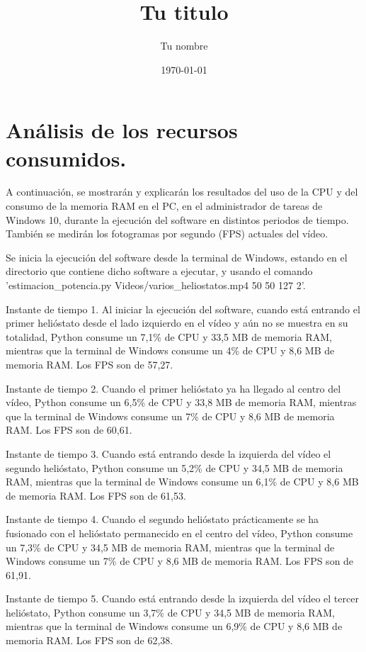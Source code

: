 \documentclass[12pt]{article}
\title{Tu titulo}					%
\author{Tu nombre}					%
\date{\today}						%
\begin{document}
\tableofcontents
\pagebreak


\section{Análisis de los recursos consumidos.}

A continuación, se mostrarán y explicarán los resultados del uso de la CPU y del consumo de la memoria RAM en el PC, en el administrador de tareas de Windows 10, durante la ejecución del software en distintos periodos de tiempo. También se medirán los fotogramas por segundo (FPS) actuales del vídeo.

Se inicia la ejecución del software desde la terminal de Windows, estando en el directorio que contiene dicho software a ejecutar, y usando el comando 'estimacion\_potencia.py Videos/varios\_heliostatos.mp4 50 50 127 2'.



Instante de tiempo 1. Al iniciar la ejecución del software, cuando está entrando el primer helióstato desde el lado izquierdo en el vídeo y aún no se muestra en su totalidad, Python consume un 7,1\% de CPU y 33,5 MB de memoria RAM, mientras que la terminal de Windows consume un 4\% de CPU y 8,6 MB de memoria RAM. Los FPS son de 57,27.




Instante de tiempo 2. Cuando el primer helióstato ya ha llegado al centro del vídeo, Python consume un 6,5\% de CPU y 33,8 MB de memoria RAM, mientras que la terminal de Windows consume un 7\% de CPU y 8,6 MB de memoria RAM. Los FPS son de 60,61.




Instante de tiempo 3. Cuando está entrando desde la izquierda del vídeo el segundo helióstato, Python consume un 5,2\% de CPU y 34,5 MB de memoria RAM, mientras que la terminal de Windows consume un 6,1\% de CPU y 8,6 MB de memoria RAM. Los FPS son de 61,53.




Instante de tiempo 4. Cuando el segundo helióstato prácticamente se ha fusionado con el helióstato permanecido en el centro del vídeo, Python consume un 7,3\% de CPU y 34,5 MB de memoria RAM, mientras que la terminal de Windows consume un 7\% de CPU y 8,6 MB de memoria RAM. Los FPS son de 61,91.




Instante de tiempo 5. Cuando está entrando desde la izquierda del vídeo el tercer helióstato, Python consume un 3,7\% de CPU y 34,5 MB de memoria RAM, mientras que la terminal de Windows consume un 6,9\% de CPU y 8,6 MB de memoria RAM. Los FPS son de 62,38.
\end{document}
